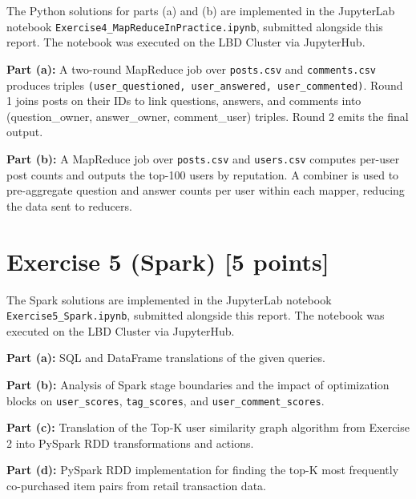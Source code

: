 \documentclass[a4paper,11pt]{article}
\begin{document}
The Python solutions for parts (a) and (b) are implemented in the JupyterLab notebook \texttt{Exercise4\_MapReduceInPractice.ipynb}, submitted alongside this report. The notebook was executed on the LBD Cluster via JupyterHub.

\textbf{Part (a):} A two-round MapReduce job over \texttt{posts.csv} and \texttt{comments.csv} produces triples \texttt{(user\_questioned, user\_answered, user\_commented)}. Round 1 joins posts on their IDs to link questions, answers, and comments into (question\_owner, answer\_owner, comment\_user) triples. Round 2 emits the final output.

\textbf{Part (b):} A MapReduce job over \texttt{posts.csv} and \texttt{users.csv} computes per-user post counts and outputs the top-100 users by reputation. A combiner is used to pre-aggregate question and answer counts per user within each mapper, reducing the data sent to reducers.

\newpage
\section*{Exercise 5 (Spark) [5 points]}

The Spark solutions are implemented in the JupyterLab notebook \texttt{Exercise5\_Spark.ipynb}, submitted alongside this report. The notebook was executed on the LBD Cluster via JupyterHub.

\textbf{Part (a):} SQL and DataFrame translations of the given queries.

\textbf{Part (b):} Analysis of Spark stage boundaries and the impact of optimization blocks on \texttt{user\_scores}, \texttt{tag\_scores}, and \texttt{user\_comment\_scores}.

\textbf{Part (c):} Translation of the Top-K user similarity graph algorithm from Exercise 2 into PySpark RDD transformations and actions.

\textbf{Part (d):} PySpark RDD implementation for finding the top-K most frequently co-purchased item pairs from retail transaction data.

\end{document}
